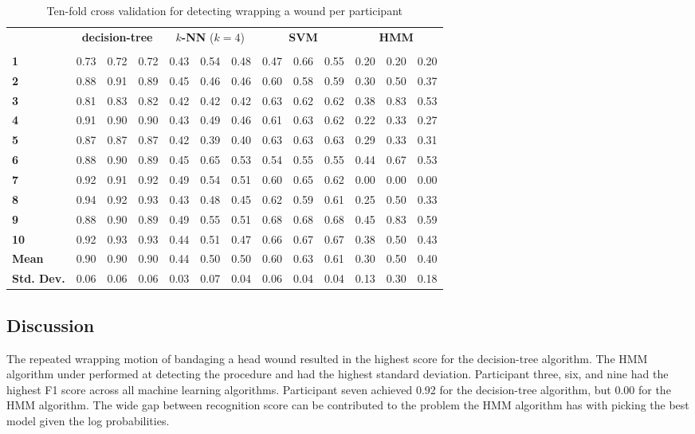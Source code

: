 \begin{table}[]
	\centering
	\begin{tabular}{lllllllllllll}
		\multirow{2}{*}{\rotatebox[origin=c]{45}{\textbf{Participant}}} & \multicolumn{3}{c}{\textbf{decision-tree}} & \multicolumn{3}{c}{\textbf{$k$-NN} ($k=4$)} & \multicolumn{3}{c}{\textbf{SVM}} & \multicolumn{3}{c}{\textbf{HMM}} \\
		 & \rot{Precision}     & \rot{Recall}    & \rot{F1}    & \rot{Precision}     & \rot{Recall}    & \rot{F1}  & \rot{Precision}     & \rot{Recall}    & \rot{F1} & \rot{Precision}     & \rot{Recall}    & \rot{F1} \\
		\textbf{1}   & 0.73 & 0.72 & 0.72 & 0.43 & 0.54 & 0.48 & 0.47 & 0.66 & 0.55 & 0.20 & 0.20 & 0.20 \\
		\textbf{2}   & 0.88 & 0.91 & 0.89 & 0.45 & 0.46 & 0.46 & 0.60 & 0.58 & 0.59 & 0.30 & 0.50 & 0.37 \\
		\textbf{3}   & 0.81 & 0.83 & 0.82 & 0.42 & 0.42 & 0.42 & 0.63 & 0.62 & 0.62 & 0.38 & 0.83 & 0.53 \\
		\textbf{4}   & 0.91 & 0.90 & 0.90 & 0.43 & 0.49 & 0.46 & 0.61 & 0.63 & 0.62 & 0.22 & 0.33 & 0.27 \\
		\textbf{5}   & 0.87 & 0.87 & 0.87 & 0.42 & 0.39 & 0.40 & 0.63 & 0.63 & 0.63 & 0.29 & 0.33 & 0.31 \\
		\textbf{6}   & 0.88 & 0.90 & 0.89 & 0.45 & 0.65 & 0.53 & 0.54 & 0.55 & 0.55 & 0.44 & 0.67 & 0.53 \\
		\textbf{7}   & 0.92 & 0.91 & 0.92 & 0.49 & 0.54 & 0.51 & 0.60 & 0.65 & 0.62 & 0.00 & 0.00 & 0.00 \\
		\textbf{8}   & 0.94 & 0.92 & 0.93 & 0.43 & 0.48 & 0.45 & 0.62 & 0.59 & 0.61 & 0.25 & 0.50 & 0.33 \\
		\textbf{9}   & 0.88 & 0.90 & 0.89 & 0.49 & 0.55 & 0.51 & 0.68 & 0.68 & 0.68 & 0.45 & 0.83 & 0.59 \\
		\textbf{10} & 0.92 & 0.93 & 0.93 & 0.44 & 0.51 & 0.47 & 0.66 & 0.67 & 0.67 & 0.38 & 0.50 & 0.43 \\
		\hline
		\textbf{Mean} & 0.90 & 0.90 & 0.90 & 0.44 & 0.50 & 0.50 & 0.60 & 0.63 & 0.61 & 0.30 & 0.50 & 0.40 \\
		\textbf{Std. Dev.} & 0.06 & 0.06 & 0.06 & 0.03 & 0.07 & 0.04 & 0.06 & 0.04 & 0.04 & 0.13 & 0.30 & 0.18
	\end{tabular}
	\caption{Ten-fold cross validation for detecting wrapping a wound per participant}
	\label{tab:w:ml}
\end{table}
\subsection{Discussion}
\label{sec:Results:Wound:Discussion}
The repeated wrapping motion of bandaging a head wound resulted in the highest score for the decision-tree algorithm. The HMM algorithm under performed at detecting the procedure and had the highest standard deviation. Participant three, six, and nine had the highest F1 score across all machine learning algorithms. Participant seven achieved 0.92 for the decision-tree algorithm, but 0.00 for the HMM algorithm. The wide gap between recognition score can be contributed to the problem the HMM algorithm has with picking the best model given the log probabilities.
